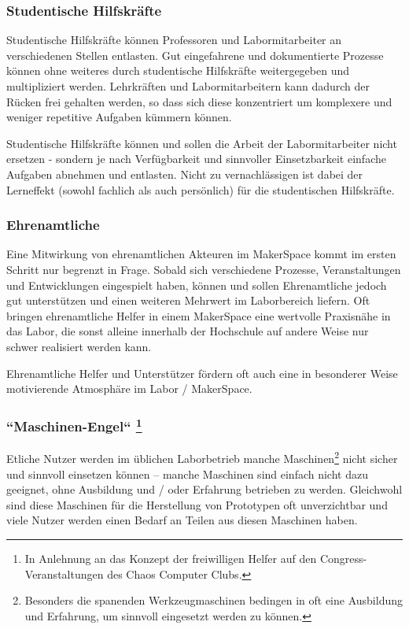 \documentclass[parskip=half,headsepline,footsepline,titlepage]{scrartcl}
\begin{document}
\subsubsection{Studentische Hilfskräfte}
Studentische Hilfskräfte können Professoren und Labormitarbeiter an verschiedenen Stellen entlasten. Gut eingefahrene und dokumentierte Prozesse können ohne weiteres durch studentische Hilfskräfte weitergegeben und multipliziert werden. Lehrkräften und Labormitarbeitern kann dadurch der Rücken frei gehalten werden, so dass sich diese konzentriert um komplexere und weniger repetitive Aufgaben kümmern können.

Studentische Hilfskräfte können und sollen die Arbeit der Labormitarbeiter nicht ersetzen - sondern je nach Verfügbarkeit und sinnvoller Einsetzbarkeit einfache Aufgaben abnehmen und entlasten. Nicht zu vernachlässigen ist dabei der Lerneffekt (sowohl fachlich als auch persönlich) für die studentischen Hilfskräfte.


\subsubsection{Ehrenamtliche}
Eine Mitwirkung von ehrenamtlichen Akteuren im MakerSpace kommt im ersten Schritt nur begrenzt in Frage. Sobald sich verschiedene Prozesse, Veranstaltungen und Entwicklungen eingespielt haben, können und sollen Ehrenamtliche jedoch gut unterstützen und einen weiteren Mehrwert im Laborbereich liefern.
Oft bringen ehrenamtliche Helfer in einem MakerSpace eine wertvolle Praxisnähe in das Labor, die sonst alleine innerhalb der Hochschule auf andere Weise nur schwer realisiert werden kann.

Ehrenamtliche Helfer und Unterstützer fördern oft auch eine in besonderer Weise motivierende Atmosphäre im Labor / MakerSpace.


\label{sssec:maschinenengel}\subsubsection[``Maschinen-Engel'']{``Maschinen-Engel`` \protect\footnote{In Anlehnung an das Konzept der freiwilligen Helfer auf den Congress-Veranstaltungen des Chaos Computer Clubs.} }
Etliche Nutzer werden im üblichen Laborbetrieb manche Maschinen\footnote{Besonders die spanenden Werkzeugmaschinen bedingen in oft eine Ausbildung und Erfahrung, um sinnvoll eingesetzt werden zu können.} nicht sicher und sinnvoll einsetzen können -- manche Maschinen sind einfach nicht dazu geeignet, ohne Ausbildung und / oder Erfahrung betrieben zu werden.
Gleichwohl sind diese Maschinen für die Herstellung von Prototypen oft unverzichtbar und viele Nutzer werden einen Bedarf an Teilen aus diesen Maschinen haben.
\end{document}
